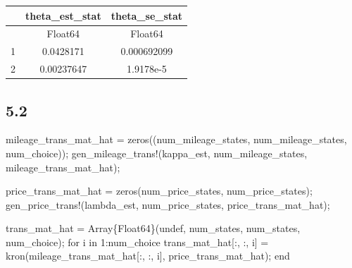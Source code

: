 \documentclass[
  letterpaper,
  DIV=11,
  numbers=noendperiod]{scrreprt}
\newenvironment{Shaded}{\begin{snugshade}}{\end{snugshade}}
\newcommand{\ConstantTok}[1]{\textcolor[rgb]{0.56,0.35,0.01}{#1}}
\newcommand{\ControlFlowTok}[1]{\textcolor[rgb]{0.00,0.23,0.31}{#1}}
\newcommand{\DataTypeTok}[1]{\textcolor[rgb]{0.68,0.00,0.00}{#1}}
\newcommand{\FloatTok}[1]{\textcolor[rgb]{0.68,0.00,0.00}{#1}}
\newcommand{\FunctionTok}[1]{\textcolor[rgb]{0.28,0.35,0.67}{#1}}
\newcommand{\KeywordTok}[1]{\textcolor[rgb]{0.00,0.23,0.31}{#1}}
\newcommand{\NormalTok}[1]{\textcolor[rgb]{0.00,0.23,0.31}{#1}}
\newcommand{\OperatorTok}[1]{\textcolor[rgb]{0.37,0.37,0.37}{#1}}
\begin{document}
\begin{tabular}{r|cc}
    & theta\_est\_stat & theta\_se\_stat\\
    \hline
    & Float64 & Float64\\
    \hline
    1 & 0.0428171 & 0.000692099 \\
    2 & 0.00237647 & 1.9178e-5 \\
\end{tabular}

\hypertarget{section-29}{%
\subsection{5.2}\label{section-29}}

\begin{Shaded}
\begin{Highlighting}[]
\NormalTok{mileage\_trans\_mat\_hat }\OperatorTok{=} \FunctionTok{zeros}\NormalTok{((num\_mileage\_states, num\_mileage\_states, num\_choice));}
\FunctionTok{gen\_mileage\_trans!}\NormalTok{(kappa\_est, num\_mileage\_states, mileage\_trans\_mat\_hat);}

\NormalTok{price\_trans\_mat\_hat }\OperatorTok{=} \FunctionTok{zeros}\NormalTok{(num\_price\_states, num\_price\_states);}
\FunctionTok{gen\_price\_trans!}\NormalTok{(lambda\_est, num\_price\_states, price\_trans\_mat\_hat);}

\NormalTok{trans\_mat\_hat }\OperatorTok{=} \FunctionTok{Array}\DataTypeTok{\{Float64\}}\NormalTok{(}\ConstantTok{undef}\NormalTok{, num\_states, num\_states, num\_choice);}
\ControlFlowTok{for}\NormalTok{ i }\KeywordTok{in} \FloatTok{1}\OperatorTok{:}\NormalTok{num\_choice}
\NormalTok{    trans\_mat\_hat[}\OperatorTok{:}\NormalTok{, }\OperatorTok{:}\NormalTok{, i] }\OperatorTok{=} \FunctionTok{kron}\NormalTok{(mileage\_trans\_mat\_hat[}\OperatorTok{:}\NormalTok{, }\OperatorTok{:}\NormalTok{, i], price\_trans\_mat\_hat);}
\ControlFlowTok{end}
\end{Highlighting}
\end{Shaded}
\end{document}
